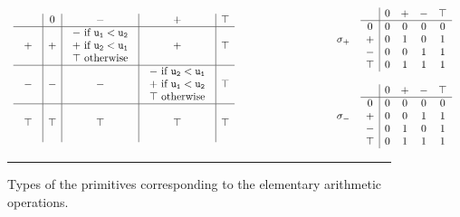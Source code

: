 \begin{figure}[tb]
$$\begin{array}{ccc}
\begin{array}{c|c|c|c|c}
\begin{array}{c}
  \end{array}    & 0 & - & + & \top \\
  \hline
  +    & + &  
  \begin{array}{c}
  - \ \text{if}\ \mathtt{u_1}<\mathtt{u_2}\\
  + \ \text{if}\ \mathtt{u_2}<\mathtt{u_1}\\
  \top\ \text{otherwise}
  \end{array}& +&\top\\
  \hline
  -     & - & - &
  \begin{array}{c}
  - \ \text{if}\ \mathtt{u_2}<\mathtt{u_1}\\
  + \ \text{if}\ \mathtt{u_1}<\mathtt{u_2}\\
  \top\ \text{otherwise}
  \end{array}
  &\top\\
  \hline
  \begin{array}{c}
  \\ \top\\ \\
  \end{array} &\top &\top&\top&\top
\end{array}
&\hspace{2.5cm}&
\begin{array}{cc}
\sigma_+&
\begin{array}{c|cccc}
  & 0 & + & - & \top \\
  \hline
0& 0 & 0  & 0 & 0 \\
+& 0 & 1 & 0 & 1\\
-& 0 & 0 & 1 & 1\\
\top&0&1 & 1 &1 
\end{array}
\\
&\\
\sigma_- &
\begin{array}{c|cccc}
  & 0 & + & - & \top \\
  \hline
0& 0 & 0  & 0 & 0 \\
+& 0 & 0 & 1 & 1\\
-& 0 & 1 & 0 & 1\\
\top&0&1 & 1 &1 
\end{array}
\end{array}
\end{array}
$$
\hrule
\caption{\label{figtypprim}Types of the primitives corresponding to the elementary arithmetic operations.} 
\end{figure}


